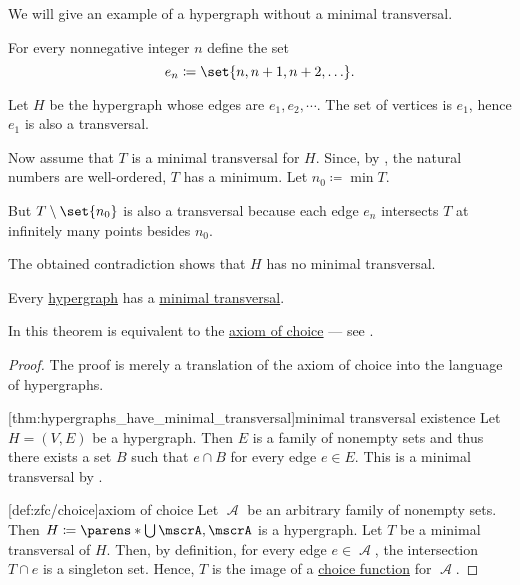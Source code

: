 \begin{example}\label{ex:hypergraph_with_no_minimal_transversal}
  We will give an example of a hypergraph without a minimal transversal.

  For every nonnegative integer \( n \) define the set
  \begin{equation*}
    e_n \coloneqq \set{ n, n + 1, n + 2, \ldots }.
  \end{equation*}

  Let \( H \) be the hypergraph whose edges are \( e_1, e_2, \cdots \). The set of vertices is \( e_1 \), hence \( e_1 \) is also a transversal.

  Now assume that \( T \) is a minimal transversal for \( H \). Since, by , the natural numbers are well-ordered, \( T \) has a minimum. Let \( n_0 \coloneqq \min T \).

  But \( T \setminus \set{ n_0 } \) is also a transversal because each edge \( e_n \) intersects \( T \) at infinitely many points besides \( n_0 \).

  The obtained contradiction shows that \( H \) has no minimal transversal.
\end{example}

\begin{theorem}\label{thm:hypergraphs_have_minimal_transversal}
  Every \hyperref[def:graph/hypergraph]{hypergraph} has a \hyperref[def:graph/hypergraph_minimal_transversal]{minimal transversal}.

  In \hyperref[def:zfc]{} this theorem is equivalent to the \hyperref[def:zfc/choice]{axiom of choice} --- see .
\end{theorem}
\begin{proof}
  The proof is merely a translation of the axiom of choice into the language of hypergraphs.

  [thm:hypergraphs_have_minimal_transversal]{minimal transversal existence} Let \( H = (V, E) \) be a hypergraph. Then \( E \) is a family of nonempty sets and thus there exists a set \( B \) such that \( e \cap B \) for every edge \( e \in E \). This is a minimal transversal by .

  [def:zfc/choice]{axiom of choice} Let \( \mscrA \) be an arbitrary family of nonempty sets. Then \( H \coloneqq \parens*{ \bigcup \mscrA, \mscrA } \) is a hypergraph. Let \( T \) be a minimal transversal of \( H \). Then, by definition, for every edge \( e \in \mscrA \), the intersection \( T \cap e \) is a singleton set. Hence, \( T \) is the image of a \hyperref[def:choice_function]{choice function} for \( \mscrA \).
\end{proof}

